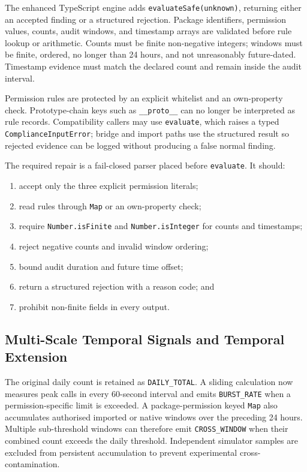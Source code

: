 The enhanced TypeScript engine adds \texttt{evaluateSafe(unknown)}, returning either an accepted finding or a structured rejection. Package identifiers, permission values, counts, audit windows, and timestamp arrays are validated before rule lookup or arithmetic. Counts must be finite non-negative integers; windows must be finite, ordered, no longer than 24 hours, and not unreasonably future-dated. Timestamp evidence must match the declared count and remain inside the audit interval.

Permission rules are protected by an explicit whitelist and an own-property check. Prototype-chain keys such as \texttt{\_\_proto\_\_} can no longer be interpreted as rule records. Compatibility callers may use \texttt{evaluate}, which raises a typed \texttt{ComplianceInputError}; bridge and import paths use the structured result so rejected evidence can be logged without producing a false normal finding.

The required repair is a fail-closed parser placed before \texttt{evaluate}. It should:

\begin{enumerate}
    \item accept only the three explicit permission literals;
    \item read rules through \texttt{Map} or an own-property check;
    \item require \texttt{Number.isFinite} and \texttt{Number.isInteger} for counts and timestamps;
    \item reject negative counts and invalid window ordering;
    \item bound audit duration and future time offset;
    \item return a structured rejection with a reason code; and
    \item prohibit non-finite fields in every output.
\end{enumerate}

\subsection{Multi-Scale Temporal Signals and Temporal Extension}

The original daily count is retained as \texttt{DAILY\_TOTAL}. A sliding calculation now measures peak calls in every 60-second interval and emits \texttt{BURST\_RATE} when a permission-specific limit is exceeded. A package-permission keyed \texttt{Map} also accumulates authorised imported or native windows over the preceding 24 hours. Multiple sub-threshold windows can therefore emit \texttt{CROSS\_WINDOW} when their combined count exceeds the daily threshold. Independent simulator samples are excluded from persistent accumulation to prevent experimental cross-contamination.

